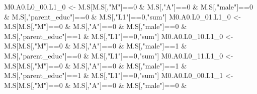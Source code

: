 \documentclass[
]{book}
\newenvironment{Shaded}{\begin{snugshade}}{\end{snugshade}}
\newcommand{\DecValTok}[1]{\textcolor[rgb]{0.00,0.00,0.81}{#1}}
\newcommand{\NormalTok}[1]{#1}
\newcommand{\OtherTok}[1]{\textcolor[rgb]{0.56,0.35,0.01}{#1}}
\newcommand{\SpecialCharTok}[1]{\textcolor[rgb]{0.00,0.00,0.00}{#1}}
\newcommand{\StringTok}[1]{\textcolor[rgb]{0.31,0.60,0.02}{#1}}
\begin{document}
\begin{Shaded}
\begin{Highlighting}[]
\NormalTok{  M0.A0.L0\_00.L1\_0 }\OtherTok{\textless{}{-}}\NormalTok{ M.S[M.S[,}\StringTok{"M"}\NormalTok{]}\SpecialCharTok{==}\DecValTok{0} \SpecialCharTok{\&}\NormalTok{ M.S[,}\StringTok{"A"}\NormalTok{]}\SpecialCharTok{==}\DecValTok{0} \SpecialCharTok{\&}\NormalTok{ M.S[,}\StringTok{"male"}\NormalTok{]}\SpecialCharTok{==}\DecValTok{0} \SpecialCharTok{\&} 
\NormalTok{                            M.S[,}\StringTok{"parent\_educ"}\NormalTok{]}\SpecialCharTok{==}\DecValTok{0} \SpecialCharTok{\&}\NormalTok{ M.S[,}\StringTok{"L1"}\NormalTok{]}\SpecialCharTok{==}\DecValTok{0}\NormalTok{,}\StringTok{"sum"}\NormalTok{]}
\NormalTok{  M0.A0.L0\_01.L1\_0 }\OtherTok{\textless{}{-}}\NormalTok{ M.S[M.S[,}\StringTok{"M"}\NormalTok{]}\SpecialCharTok{==}\DecValTok{0} \SpecialCharTok{\&}\NormalTok{ M.S[,}\StringTok{"A"}\NormalTok{]}\SpecialCharTok{==}\DecValTok{0} \SpecialCharTok{\&}\NormalTok{ M.S[,}\StringTok{"male"}\NormalTok{]}\SpecialCharTok{==}\DecValTok{0} \SpecialCharTok{\&} 
\NormalTok{                            M.S[,}\StringTok{"parent\_educ"}\NormalTok{]}\SpecialCharTok{==}\DecValTok{1} \SpecialCharTok{\&}\NormalTok{ M.S[,}\StringTok{"L1"}\NormalTok{]}\SpecialCharTok{==}\DecValTok{0}\NormalTok{,}\StringTok{"sum"}\NormalTok{]}
\NormalTok{  M0.A0.L0\_10.L1\_0 }\OtherTok{\textless{}{-}}\NormalTok{ M.S[M.S[,}\StringTok{"M"}\NormalTok{]}\SpecialCharTok{==}\DecValTok{0} \SpecialCharTok{\&}\NormalTok{ M.S[,}\StringTok{"A"}\NormalTok{]}\SpecialCharTok{==}\DecValTok{0} \SpecialCharTok{\&}\NormalTok{ M.S[,}\StringTok{"male"}\NormalTok{]}\SpecialCharTok{==}\DecValTok{1} \SpecialCharTok{\&} 
\NormalTok{                            M.S[,}\StringTok{"parent\_educ"}\NormalTok{]}\SpecialCharTok{==}\DecValTok{0} \SpecialCharTok{\&}\NormalTok{ M.S[,}\StringTok{"L1"}\NormalTok{]}\SpecialCharTok{==}\DecValTok{0}\NormalTok{,}\StringTok{"sum"}\NormalTok{]}
\NormalTok{  M0.A0.L0\_11.L1\_0 }\OtherTok{\textless{}{-}}\NormalTok{ M.S[M.S[,}\StringTok{"M"}\NormalTok{]}\SpecialCharTok{==}\DecValTok{0} \SpecialCharTok{\&}\NormalTok{ M.S[,}\StringTok{"A"}\NormalTok{]}\SpecialCharTok{==}\DecValTok{0} \SpecialCharTok{\&}\NormalTok{ M.S[,}\StringTok{"male"}\NormalTok{]}\SpecialCharTok{==}\DecValTok{1} \SpecialCharTok{\&} 
\NormalTok{                            M.S[,}\StringTok{"parent\_educ"}\NormalTok{]}\SpecialCharTok{==}\DecValTok{1} \SpecialCharTok{\&}\NormalTok{ M.S[,}\StringTok{"L1"}\NormalTok{]}\SpecialCharTok{==}\DecValTok{0}\NormalTok{,}\StringTok{"sum"}\NormalTok{]}
\NormalTok{  M0.A0.L0\_00.L1\_1 }\OtherTok{\textless{}{-}}\NormalTok{ M.S[M.S[,}\StringTok{"M"}\NormalTok{]}\SpecialCharTok{==}\DecValTok{0} \SpecialCharTok{\&}\NormalTok{ M.S[,}\StringTok{"A"}\NormalTok{]}\SpecialCharTok{==}\DecValTok{0} \SpecialCharTok{\&}\NormalTok{ M.S[,}\StringTok{"male"}\NormalTok{]}\SpecialCharTok{==}\DecValTok{0} \SpecialCharTok{\&} 

\end{Highlighting}
\end{Shaded}
\end{document}
